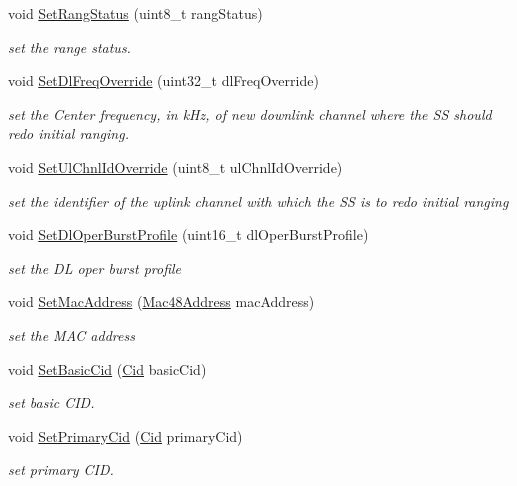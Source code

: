 \begin{DoxyCompactItemize}
void \hyperlink{classns3_1_1RngRsp_ad4f2d7daa515310d4439786688eacd36}{Set\+Rang\+Status} (uint8\+\_\+t rang\+Status)
\begin{DoxyCompactList}\small\item\em set the range status. \end{DoxyCompactList}\item 
void \hyperlink{classns3_1_1RngRsp_aa4f07b198beaefd83b4c4e695b940e0a}{Set\+Dl\+Freq\+Override} (uint32\+\_\+t dl\+Freq\+Override)
\begin{DoxyCompactList}\small\item\em set the Center frequency, in k\+Hz, of new downlink channel where the SS should redo initial ranging. \end{DoxyCompactList}\item 
void \hyperlink{classns3_1_1RngRsp_a209bf0515197b9aa00252af95a1c5048}{Set\+Ul\+Chnl\+Id\+Override} (uint8\+\_\+t ul\+Chnl\+Id\+Override)
\begin{DoxyCompactList}\small\item\em set the identifier of the uplink channel with which the SS is to redo initial ranging \end{DoxyCompactList}\item 
void \hyperlink{classns3_1_1RngRsp_a6a8b5496c61d6b5f216a08c21b9acc32}{Set\+Dl\+Oper\+Burst\+Profile} (uint16\+\_\+t dl\+Oper\+Burst\+Profile)
\begin{DoxyCompactList}\small\item\em set the DL oper burst profile \end{DoxyCompactList}\item 
void \hyperlink{classns3_1_1RngRsp_a080e954717c6d7ef5cae0f8dcf069d99}{Set\+Mac\+Address} (\hyperlink{classns3_1_1Mac48Address}{Mac48\+Address} mac\+Address)
\begin{DoxyCompactList}\small\item\em set the M\+AC address \end{DoxyCompactList}\item 
void \hyperlink{classns3_1_1RngRsp_a4a5b935ea4c1962ea4c4fa0ba7860e65}{Set\+Basic\+Cid} (\hyperlink{classns3_1_1Cid}{Cid} basic\+Cid)
\begin{DoxyCompactList}\small\item\em set basic C\+ID. \end{DoxyCompactList}\item 
void \hyperlink{classns3_1_1RngRsp_a73d5fef141daab33f39ebe4fa72b1f77}{Set\+Primary\+Cid} (\hyperlink{classns3_1_1Cid}{Cid} primary\+Cid)
\begin{DoxyCompactList}\small\item\em set primary C\+ID. \end{DoxyCompactList}\item 

\end{DoxyCompactItemize}
